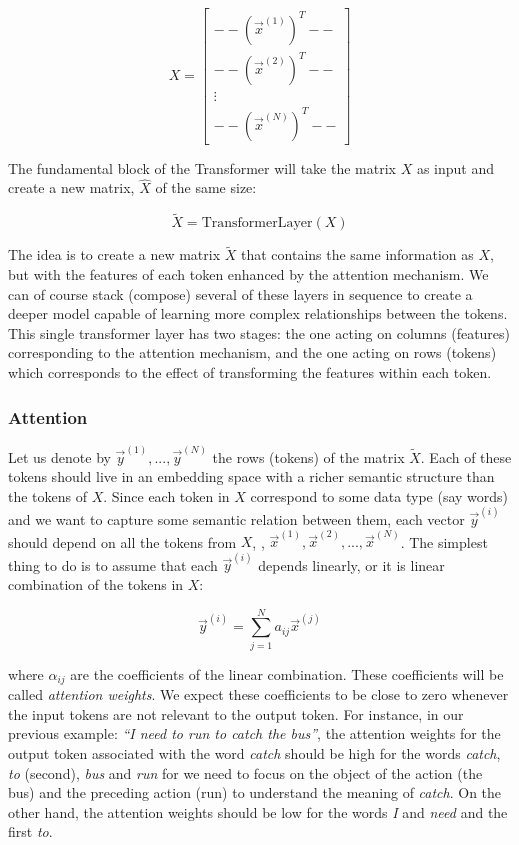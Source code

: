 \begin{equation}
    X = \begin{bmatrix}
       -- (\vec{x}^{(1)})^T -- \\
       -- (\vec{x}^{(2)})^T -- \\
        \vdots \\
       -- (\vec{x}^{(N)})^T --
    \end{bmatrix} 
\end{equation}   

The fundamental block of the Transformer will take the matrix $X$ as input and create a new matrix, $\widehat{X}$ of the same size: 

$$
\widetilde{X} = \textrm{TransformerLayer}(X)
$$

The idea is to create a new matrix $\widetilde{X}$ that contains the same information as $X$, but with the features of each token enhanced by the attention mechanism. We can of course stack (compose) several of these layers in sequence to create a deeper model capable of learning more complex relationships between the tokens. This single transformer layer has two stages: the one acting on columns (features) corresponding to the attention mechanism, and the one acting on rows (tokens) which corresponds to the effect of transforming the features within each token. 


\subsubsection*{Attention}

Let us denote by $\vec{y}^{(1)},...,\vec{y}^{(N)}$ the rows (tokens) of the matrix $\widetilde{X}$. Each of these tokens should live in an embedding space with a richer semantic structure than the tokens of $X$. Since each token in $X$ correspond to some data type (say words) and we want to capture some semantic relation between them, each vector $\vec{y}^{(i)}$ should depend on all the tokens from $X$, \ie, $\vec{x}^{(1)}, \vec{x}^{(2)},...,\vec{x}^{(N)}$. The simplest thing to do is to assume that each $\vec{y}^{(i)}$ depends linearly, or it is linear combination of the tokens in $X$: 

\[ \vec{y}^{(i)} = \sum_{j=1}^N a_{ij} \vec{x}^{(j)} \]

where $\alpha_{ij}$ are the coefficients of the linear combination. These coefficients will be called \emph{attention weights}. We expect these coefficients to be close to zero whenever the input tokens are not relevant to the output token. For instance, in our previous example: \emph{``I need to run to catch the bus''}, the attention weights for the output token associated with the word \textit{catch} should be high for the words \textit{catch}, \textit{to} (second), \textit{bus} and \textit{run} for we need to focus on the object of the action (the bus) and the preceding action (run) to understand the meaning of \textit{catch}. On the other hand, the attention weights should be low for the words \textit{I} and \textit{need} and the first \textit{to}.    

